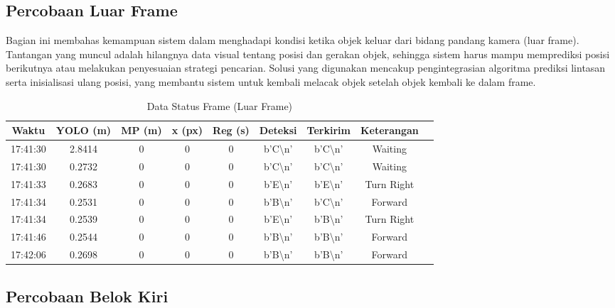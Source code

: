\subsection{Percobaan Luar Frame}
\label{subsec:percobaanluarframe}

Bagian ini membahas kemampuan sistem dalam menghadapi kondisi ketika objek keluar dari bidang pandang kamera (luar frame). Tantangan yang muncul adalah hilangnya data visual tentang posisi dan gerakan objek, sehingga sistem harus mampu memprediksi posisi berikutnya atau melakukan penyesuaian strategi pencarian. Solusi yang digunakan mencakup pengintegrasian algoritma prediksi lintasan serta inisialisasi ulang posisi, yang membantu sistem untuk kembali melacak objek setelah objek kembali ke dalam frame.

\begin{table}[H]
    \centering
    \caption{Data Status Frame (Luar Frame)}
    \label{tab:status_luar_frame}
    \begin{tabular}{|c|c|c|c|c|c|c|c|c|}
    \hline
    Waktu & YOLO (m) & MP (m) & x (px) & Reg (s) & Deteksi & Terkirim & Keterangan \\ \hline
    17:41:30 & 2.8414 & 0 & 0 & 0 & b'C\textbackslash n' & b'C\textbackslash n' & Waiting \\ \hline
    17:41:30 & 0.2732 & 0 & 0 & 0 & b'C\textbackslash n' & b'C\textbackslash n' & Waiting \\ \hline
    17:41:33 & 0.2683 & 0 & 0 & 0 & b'E\textbackslash n' & b'E\textbackslash n' & Turn Right \\ \hline
    17:41:34 & 0.2531 & 0 & 0 & 0 & b'B\textbackslash n' & b'C\textbackslash n' & Forward \\ \hline
    17:41:34 & 0.2539 & 0 & 0 & 0 & b'E\textbackslash n' & b'B\textbackslash n' & Turn Right \\ \hline
    17:41:46 & 0.2544 & 0 & 0 & 0 & b'B\textbackslash n' & b'B\textbackslash n' & Forward \\ \hline
    17:42:06 & 0.2698 & 0 & 0 & 0 & b'B\textbackslash n' & b'B\textbackslash n' & Forward \\ \hline
    \end{tabular}
\end{table}

\subsection{Percobaan Belok Kiri}
\label{subsec:percobaanbelokkiri}

